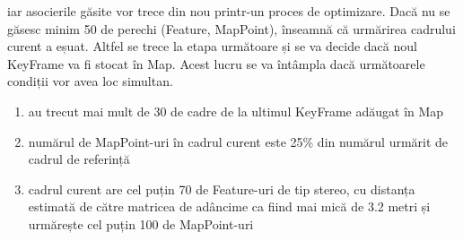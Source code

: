 \documentclass[12pt,a4paper]{report}
\begin{document}
iar asocierile găsite vor trece din nou printr-un proces de optimizare. Dacă nu se găsesc minim
50 de perechi (Feature, MapPoint), înseamnă că urmărirea cadrului curent a eșuat. Altfel se 
trece la etapa următoare și se va decide dacă  noul KeyFrame va fi stocat în Map. Acest lucru 
se va întâmpla dacă următoarele condiții vor avea loc simultan.    
\begin{enumerate}
    \item au trecut mai mult de 30 de cadre de la ultimul KeyFrame adăugat în Map
    \item numărul de MapPoint-uri în cadrul curent este 25\% din numărul urmărit de cadrul de referință
    \item cadrul curent are cel puțin 70 de Feature-uri de tip stereo, cu distanța estimată de către matricea de adâncime 
    ca fiind mai mică de 3.2 metri și urmărește cel puțin 100 de MapPoint-uri
\end{enumerate}
\end{document}
